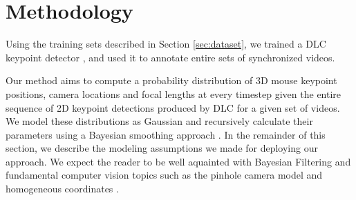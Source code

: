 \documentclass[sigconf, nonacm]{acmart}
\begin{document}
\section{Methodology}
\label{sec:method}
Using the training sets described in Section \ref{sec:dataset}, we trained a DLC keypoint detector \cite{Nath2019}, and used it to annotate entire sets of synchronized videos. \par
Our method aims to compute a probability distribution of 3D mouse keypoint positions, camera locations and focal lengths at every timestep given the entire sequence of 2D keypoint detections produced by DLC for a given set of videos. We model these distributions as Gaussian and recursively calculate their parameters using a Bayesian smoothing approach \cite{Srkk2013,Thrun2008}. In the remainder of this section, we describe the modeling assumptions we made for deploying our approach. We expect the reader to be well aquainted with Bayesian Filtering \cite{Srkk2013} and fundamental computer vision topics such as the pinhole camera model and homogeneous coordinates \cite{klette2014camera}.\par
\end{document}
